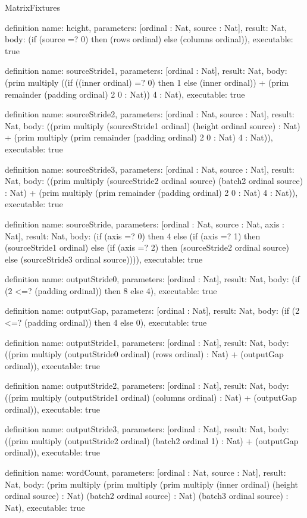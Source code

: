 \begin{lexlean}{MatrixFixtures}
\begin{semanticmodule}
definition{
  name: height,
  parameters: [ordinal : Nat, source : Nat],
  result: Nat,
  body: (if (source =? 0) then (rows ordinal) else (columns ordinal)),
  executable: true
}

definition{
  name: sourceStride1,
  parameters: [ordinal : Nat],
  result: Nat,
  body: (prim multiply ((if ((inner ordinal) =? 0) then 1 else (inner ordinal)) + (prim remainder (padding ordinal) 2 0 : Nat)) 4 : Nat),
  executable: true
}

definition{
  name: sourceStride2,
  parameters: [ordinal : Nat, source : Nat],
  result: Nat,
  body: ((prim multiply (sourceStride1 ordinal) (height ordinal source) : Nat) + (prim multiply (prim remainder (padding ordinal) 2 0 : Nat) 4 : Nat)),
  executable: true
}

definition{
  name: sourceStride3,
  parameters: [ordinal : Nat, source : Nat],
  result: Nat,
  body: ((prim multiply (sourceStride2 ordinal source) (batch2 ordinal source) : Nat) + (prim multiply (prim remainder (padding ordinal) 2 0 : Nat) 4 : Nat)),
  executable: true
}

definition{
  name: sourceStride,
  parameters: [ordinal : Nat, source : Nat, axis : Nat],
  result: Nat,
  body: (if (axis =? 0) then 4 else (if (axis =? 1) then (sourceStride1 ordinal) else (if (axis =? 2) then (sourceStride2 ordinal source) else (sourceStride3 ordinal source)))),
  executable: true
}

definition{
  name: outputStride0,
  parameters: [ordinal : Nat],
  result: Nat,
  body: (if (2 <=? (padding ordinal)) then 8 else 4),
  executable: true
}

definition{
  name: outputGap,
  parameters: [ordinal : Nat],
  result: Nat,
  body: (if (2 <=? (padding ordinal)) then 4 else 0),
  executable: true
}

definition{
  name: outputStride1,
  parameters: [ordinal : Nat],
  result: Nat,
  body: ((prim multiply (outputStride0 ordinal) (rows ordinal) : Nat) + (outputGap ordinal)),
  executable: true
}

definition{
  name: outputStride2,
  parameters: [ordinal : Nat],
  result: Nat,
  body: ((prim multiply (outputStride1 ordinal) (columns ordinal) : Nat) + (outputGap ordinal)),
  executable: true
}

definition{
  name: outputStride3,
  parameters: [ordinal : Nat],
  result: Nat,
  body: ((prim multiply (outputStride2 ordinal) (batch2 ordinal 1) : Nat) + (outputGap ordinal)),
  executable: true
}

definition{
  name: wordCount,
  parameters: [ordinal : Nat, source : Nat],
  result: Nat,
  body: (prim multiply (prim multiply (prim multiply (inner ordinal) (height ordinal source) : Nat) (batch2 ordinal source) : Nat) (batch3 ordinal source) : Nat),
  executable: true
}


\end{semanticmodule}
\end{lexlean}
